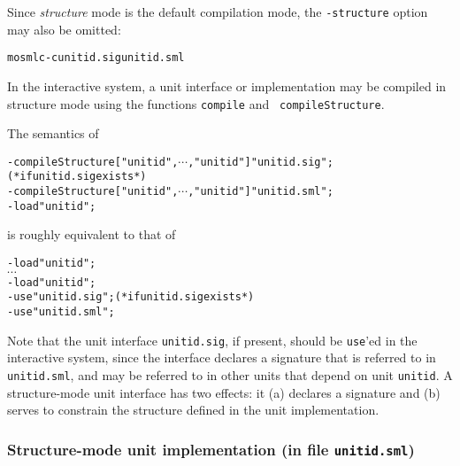 \documentclass[fleqn,a4paper]{article}
\def\allttcdots{\ensuremath{\cdots}}
\begin{document}
\noindent Since \emph{structure} mode is the default compilation
mode, the {\tt -structure} option may also be omitted:

\begin{alltt}
   mosmlc -c unitid.sig unitid.sml 
\end{alltt}

\noindent 
In the interactive system, a unit interface or implementation may be
compiled in structure mode using the functions {\tt compile} and {\tt
  compileStructure}.  

The semantics of

\begin{alltt}
   - compileStructure ["unitid\et",\allttcdots,"unitid\n"] "unitid.sig";(* if unitid.sig exists *) 
   - compileStructure ["unitid\et",\allttcdots,"unitid\n"] "unitid.sml";
   - load "unitid";
\end{alltt}
\noindent is roughly equivalent to that of
\begin{alltt}
   - load "unitid\et";
   \allttcdots
   - load "unitid\n";
   - use "unitid.sig"; (* if unitid.sig exists *)
   - use "unitid.sml";
\end{alltt}

Note that the unit interface {\tt unitid.sig}, if present, should be {\tt use}'ed in the interactive system,
since the interface declares a signature that is referred to in {\tt unitid.sml}, and may be referred to
in other units that depend on unit {\tt unitid}.
A structure-mode unit interface has two effects: it (a) declares a signature and (b)
serves to constrain the structure defined in the unit implementation.

\subsubsection*{Structure-mode unit implementation (in file {\tt unitid.sml})}
\end{document}
